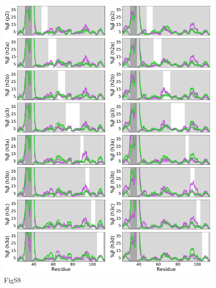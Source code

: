 \documentclass[10pt,letterpaper]{article}
\begin{document}
\begin{figure}[!ht]
\includegraphics[scale=0.5,width=\textwidth,trim={0 0cm 0 0cm},clip]{./figures/S8.pdf}
\caption{{FigS8}}
\end{figure}
\end{document}
